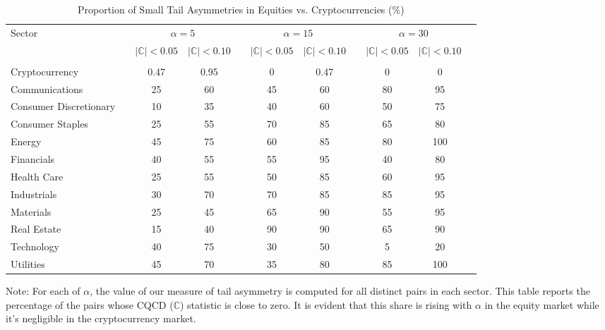 \documentclass{article}
\begin{document}
\begin{table}[H]\centering
\scriptsize
\caption{Proportion of Small Tail Asymmetries in Equities vs. Cryptocurrencies (\%)}\label{tab:asym}
\begin{threeparttable}
\begin{tabular}{lcccccccccc}\toprule
 \multirow{3}{*}{Sector}  & &\multicolumn{2}{c}{$\alpha = 5$}  & &\multicolumn{2}{c}{$\alpha = 15$} & &\multicolumn{2}{c}{$\alpha = 30$} \\\cmidrule{3-4}\cmidrule{6-7}\cmidrule{9-10}
 & & $  \big\lvert \mathbb{C} \big\rvert  < 0.05 $   & $\big\lvert \mathbb{C} \big\rvert  < 0.10 $ & &  $  \big\lvert \mathbb{C} \big\rvert  < 0.05 $   & $\big\lvert \mathbb{C} \big\rvert  < 0.10 $ & &  $  \big\lvert \mathbb{C} \big\rvert  < 0.05 $   & $\big\lvert \mathbb{C} \big\rvert  < 0.10 $   \\\midrule
& & & & & & \\[-2mm]
\multicolumn{1}{l}{Cryptocurrency}   & & 0.47 & 0.95 & & 0 & 0.47 & & 0 & 0 \\[1.25mm]
\multicolumn{1}{l}{Communications}    & & 25 & 60 & & 45 & 60 & & 80 & 95 \\
\multicolumn{1}{l}{Consumer Discretionary}    & & 10 & 35 & & 40 & 60 & & 50 & 75 \\
\multicolumn{1}{l}{Consumer Staples}  & & 25 & 55 & & 70 & 85 & & 65 & 80 \\
\multicolumn{1}{l}{Energy}           & & 45 & 75 & & 60 & 85 & & 80 & 100 \\
\multicolumn{1}{l}{Financials}       & & 40 & 55 & & 55 & 95 & & 40 & 80 \\
\multicolumn{1}{l}{Health Care}      & & 25 & 55 & & 50 & 85 & & 60 & 95 \\
\multicolumn{1}{l}{Industrials }    & & 30 & 70 & & 70 & 85 & & 85 & 95 \\
\multicolumn{1}{l}{Materials}        & & 25 & 45 & & 65 & 90 & & 55 & 95 \\
\multicolumn{1}{l}{Real Estate}      & & 15 & 40 & & 90 & 90 & & 65 & 90 \\
\multicolumn{1}{l}{Technology}       & & 40 & 75 & & 30 & 50 & & 5 & 20 \\
\multicolumn{1}{l}{Utilities}       & & 45 & 70 & & 35 & 80 & & 85 & 100 \\
\bottomrule
\end{tabular}
\begin{tablenotes}      
\item Note: For each of $\alpha$, the value of our measure of tail asymmetry is computed for all distinct pairs in each sector. This table reports the percentage of the pairs whose CQCD ($\mathbb{C}$) statistic is close to zero. It is evident that this share is rising with $\alpha$ in the equity market while it's negligible in the cryptocurrency market. 
\end{tablenotes}
\end{threeparttable}
\end{table}
\end{document}
